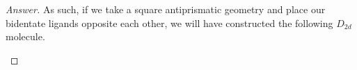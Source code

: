 \documentclass[../psets.tex]{subfiles}
\begin{document}
\begin{enumerate}[label={\Roman*)}]
\begin{proof}[Answer]
        As such, if we take a square antiprismatic geometry and place our bidentate ligands opposite each other, we will have constructed the following $D_{2d}$ molecule.
        \begin{center}
        \end{center}
    \end{proof}
\end{enumerate}
\end{document}
